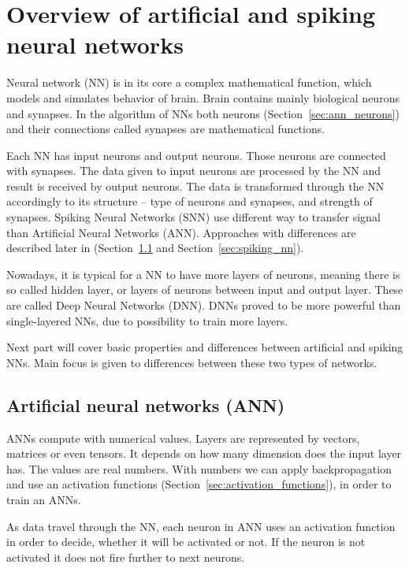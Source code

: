 \chapter{Overview of artificial and spiking neural networks}
\label{ch:overview}

Neural network (NN) is in its core a complex mathematical function, which models and simulates behavior of brain. Brain contains mainly biological neurons and synapses. In the algorithm of NNs both neurons (Section~\ref{sec:ann_neurons}) and their connections called synapses are mathematical functions.

Each NN has input neurons and output neurons. Those neurons are connected with synapses. The data given to input neurons are processed by the NN and result is received by output neurons. The data is transformed through the NN accordingly to its structure -- type of neurons and synapses, and strength of synapses. Spiking Neural Networks (SNN) use different way to transfer signal than Artificial Neural Networks (ANN). Approaches with differences are described later in (Section~\ref{sec:artificial_nn} and Section~\ref{sec:spiking_nn}).

Nowadays, it is typical for a NN to have more layers of neurons, meaning there is so called hidden layer, or layers of neurons between input and output layer. These are called Deep Neural Networks (DNN). DNNs proved to be more powerful than single-layered NNs, due to possibility to train more layers.

Next part will cover basic properties and differences between artificial and spiking NNs. Main focus is given to differences between these two types of networks.

%
%

\section{Artificial neural networks (ANN)}
\label{sec:artificial_nn}

ANNs compute with numerical values. Layers are represented by vectors, matrices or even tensors. It depends on how many dimension does the input layer has. The values are real numbers. With numbers we can apply backpropagation and use an activation functions (Section~\ref{sec:activation_functions}), in order to train an ANNs.

As data travel through the NN, each neuron in ANN uses an activation function in order to decide, whether it will be activated or not. If the neuron is not activated it does not fire further to next neurons.

